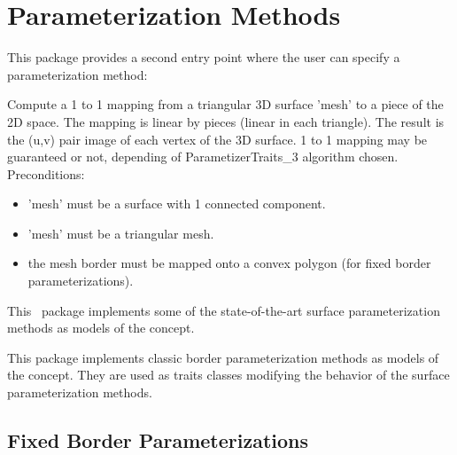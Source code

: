 \section{Parameterization Methods}


This package provides a second  entry point
where the user can specify a parameterization method:

{
Compute a 1 to 1 mapping from a triangular 3D surface 'mesh' to a piece of the 2D space. The mapping is linear by pieces (linear in each triangle). The result is the (u,v) pair image of each vertex of the 3D surface.
1 to 1 mapping may be guaranteed or not, depending of ParametizerTraits\_3 algorithm chosen.
Preconditions:\begin{itemize}
\item 'mesh' must be a surface with 1 connected component.\item 'mesh' must be a triangular mesh.\item the mesh border must be mapped onto a convex polygon (for fixed border parameterizations).\end{itemize}
}


This \cgal\ package implements some of the state-of-the-art surface
parameterization methods as models of the  concept.

This package implements classic border parameterization methods
as models of the  concept. They are used as traits classes
modifying the behavior of the surface parameterization methods.


\subsection{Fixed Border Parameterizations}

